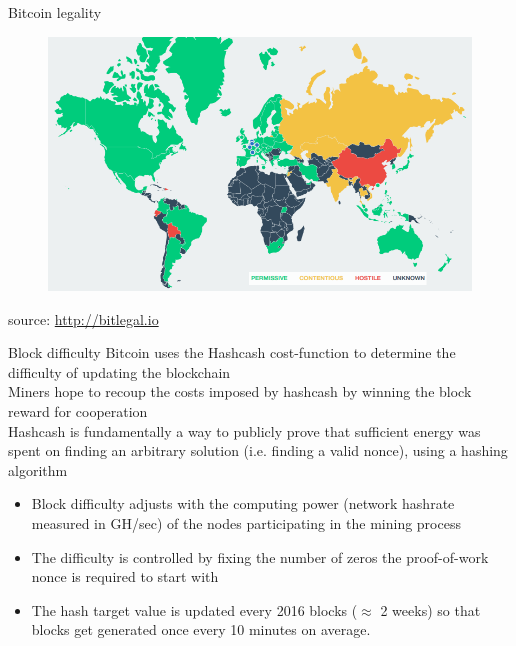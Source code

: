 \documentclass[10pt]{beamer}
\begin{document}
\begin{frame}{Bitcoin legality}
	\begin{figure}[]
		\centering
		\includegraphics  [scale=0.3]{Images/bitlegal}
	\end{figure}
		\begin{scriptsize}
		source: \href{http://bitlegal.io}{http://bitlegal.io}
	\end{scriptsize}
\end{frame}


\begin{frame}{Block difficulty}
	Bitcoin uses the Hashcash cost-function to determine the difficulty of updating the blockchain \\ \vspace{3mm}
	Miners hope to recoup the costs imposed by hashcash by winning the block reward for cooperation \\ \vspace{3mm}
	Hashcash is fundamentally a way to publicly prove that sufficient energy was spent on finding an arbitrary solution (i.e. finding a valid nonce), using a hashing algorithm
	\begin{itemize}
		\item Block difficulty adjusts with the computing power (network hashrate measured in GH/sec) of the nodes participating in the mining process
		\item The difficulty is controlled by fixing the number of zeros the proof-of-work nonce is required to start with
		\item The hash target value is updated every 2016 blocks ($\approx$ 2 weeks) so that blocks get generated once every 10 minutes on average.
	\end{itemize}
\end{frame}
\end{document}
